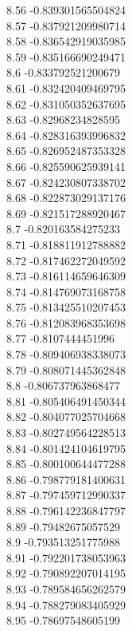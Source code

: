 {8.56	-0.839301565504824\\
8.57	-0.837921209980714\\
8.58	-0.836542919035985\\
8.59	-0.835166690249471\\
8.6	-0.833792521200679\\
8.61	-0.832420409469795\\
8.62	-0.831050352637695\\
8.63	-0.82968234828595\\
8.64	-0.828316393996832\\
8.65	-0.826952487353328\\
8.66	-0.825590625939141\\
8.67	-0.824230807338702\\
8.68	-0.822873029137176\\
8.69	-0.821517288920467\\
8.7	-0.820163584275233\\
8.71	-0.818811912788882\\
8.72	-0.817462272049592\\
8.73	-0.816114659646309\\
8.74	-0.814769073168758\\
8.75	-0.813425510207453\\
8.76	-0.812083968353698\\
8.77	-0.8107444451996\\
8.78	-0.809406938338073\\
8.79	-0.808071445362848\\
8.8	-0.806737963868477\\
8.81	-0.805406491450344\\
8.82	-0.804077025704668\\
8.83	-0.802749564228513\\
8.84	-0.801424104619795\\
8.85	-0.800100644477288\\
8.86	-0.798779181400631\\
8.87	-0.797459712990337\\
8.88	-0.796142236847797\\
8.89	-0.79482675057529\\
8.9	-0.793513251775988\\
8.91	-0.792201738053963\\
8.92	-0.790892207014195\\
8.93	-0.789584656262579\\
8.94	-0.788279083405929\\
8.95	-0.78697548605199\\
}
